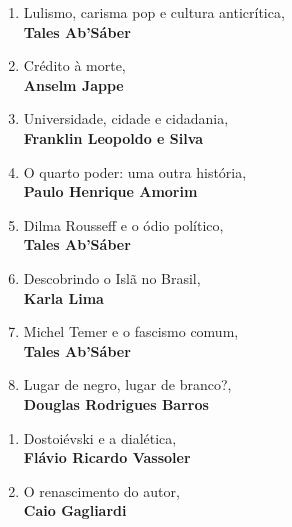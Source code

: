 \medskip
{}

\begin{enumerate} [font=\Formular\scriptsize]
\setlength\parskip{8pt}
\setlength\itemsep{-1.4mm}
\item Lulismo, carisma pop e cultura anticrítica,\\ \textbf{Tales Ab'Sáber}
\item Crédito à morte,\\ \textbf{Anselm Jappe}
\item Universidade, cidade e cidadania,\\ \textbf{Franklin Leopoldo e Silva}
\item O quarto poder: uma outra história,\\ \textbf{Paulo Henrique Amorim}
\item Dilma Rousseff e o ódio político,\\ \textbf{Tales Ab'Sáber}
\item Descobrindo o Islã no Brasil,\\ \textbf{Karla Lima}
\item Michel Temer e o fascismo comum,\\ \textbf{Tales Ab'Sáber}
\item Lugar de negro, lugar de branco?,\\ \textbf{Douglas Rodrigues Barros}
\end{enumerate}

\medskip
{}

\begin{enumerate} [font=\Formular\scriptsize]
\setlength\parskip{8pt}
\setlength\itemsep{-1.4mm}
\item Dostoiévski e a dialética,\\ \textbf{Flávio Ricardo Vassoler}
\item O renascimento do autor,\\ \textbf{Caio Gagliardi}
\end{enumerate}

\endgroup

\pagebreak
\ifodd\thepage\paginabranca\else\clearpage\fi
